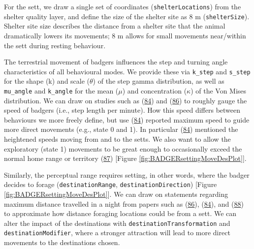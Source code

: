 \documentclass[10pt,a4paper]{article}
\newenvironment{Shaded}{}{}
\newcommand{\CommentTok}[1]{\textit{#1}}
\newcommand{\DecValTok}[1]{#1}
\newcommand{\NormalTok}[1]{#1}
\newcommand{\OtherTok}[1]{#1}
\begin{document}
\begin{Shaded}
\end{Shaded}

For the sett, we draw a single set of coordinates (\texttt{shelterLocations}) from the shelter quality layer, and define the size of the shelter site as 8 m (\texttt{shelterSize}).
Shelter site size describes the distance from a shelter site that the animal dramatically lowers its movements; 8 m allows for small movements near/within the sett during resting behaviour.

The terrestrial movement of badgers influences the step and turning angle characteristics of all behavioural modes.
We provide these via \texttt{k\_step} and \texttt{s\_step} for the shape (k) and scale (\(\theta\)) of the step gamma distribution, as well as \texttt{mu\_angle} and \texttt{k\_angle} for the mean (\(\mu\)) and concentration (\(\kappa\)) of the Von Mises distribution.
We can draw on studies such as (\protect\hyperlink{ref-kowalczyk_daily_2006}{84}) and (\protect\hyperlink{ref-rosalino_activity_2005}{86}) to roughly gauge the speed of badgers (i.e., step length per minute).
How this speed differs between behaviours we more freely define, but use (\protect\hyperlink{ref-kowalczyk_daily_2006}{84}) reported maximum speed to guide more direct movements (e.g., state 0 and 1).
In particular (\protect\hyperlink{ref-kowalczyk_daily_2006}{84}) mentioned the heightened speeds moving from and to the setts.
We also want to allow the exploratory (state 1) movements to be great enough to occasionally exceed the normal home range or territory (\protect\hyperlink{ref-kelly_extra_2020}{87}) {[}Figure \ref{fig:BADGERsettingMoveDesPlot}{]}.

Similarly, the perceptual range requires setting, in other words, where the badger decides to forage (\texttt{destinationRange}, \texttt{destinationDirection}) {[}Figure \ref{fig:BADGERsettingMoveDesPlot}{]}.
We can draw on statements regarding maximum distance travelled in a night from papers such as (\protect\hyperlink{ref-rosalino_activity_2005}{86}), (\protect\hyperlink{ref-kowalczyk_daily_2006}{84}), and (\protect\hyperlink{ref-loureiro_path_2007}{88}) to approximate how distance foraging locations could be from a sett.
We can alter the impact of the destinations with \texttt{destinationTransformation} and \texttt{destinationModifier}, where a stronger attraction will lead to more direct movements to the destinations chosen.
\end{document}
